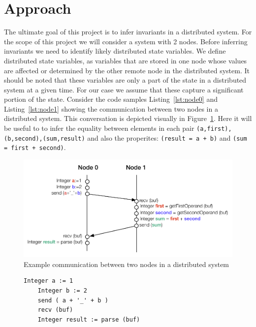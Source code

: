 \section{Approach}

The ultimate goal of this project is to infer invariants in a
distributed system. For the scope of this project we will consider a
system with 2 nodes. Before inferring invariants we need to identify
likely distributed state variables. We define distributed state
variables, as variables that are stored in one node whose values are
affected or determined by the other remote node in the distributed
system. It should be noted that these variables are only a part of the
state in a distributed system at a given time. For our case we assume
that these capture a significant portion of the state. Consider the
code samples Listing~\ref{lst:node0} and Listing~\ref{lst:node1}
showing the communication between two nodes in a distributed system.
This conversation is depicted visually in
Figure~\ref{fig:sample_code_diag}. Here it will be useful to to infer
the equality between elements in each pair \texttt{(a,first),
(b,second),(sum,result)} and also the properites: \texttt{(result = a
+ b)} and \texttt{(sum = first + second)}.


\begin{figure}
  \includegraphics[width=\columnwidth]{sample_code.pdf}
  \caption{Example communication between two nodes in a distributed system}
  \label{fig:sample_code_diag}
\end{figure}

\begin{figure}
\begin{lstlisting}[caption={Sample code for Communication between 2 nodes - Node 0}, label=lst:node0]
    Integer a := 1
    Integer b := 2
    send ( a + '_' + b )
    recv (buf)
    Integer result := parse (buf)
\end{lstlisting}
\end{figure}

